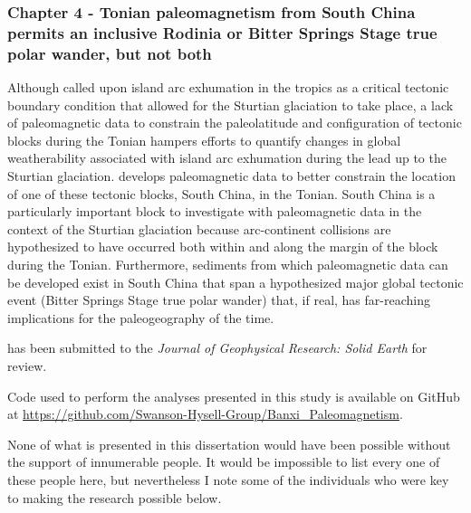 \documentclass{ucbthesis}
\begin{document}
\begin{frontmatter}
\begin{preface}
\subsubsection*{Chapter 4 - Tonian paleomagnetism from South China permits an inclusive Rodinia or Bitter Springs Stage true polar wander, but not both}

\noindent
{}

\bigskip

Although \citet{Park2020a} called upon island arc exhumation in the tropics as a critical tectonic boundary condition that allowed for the Sturtian glaciation to take place, a lack of paleomagnetic data to constrain the paleolatitude and configuration of tectonic blocks during the Tonian hampers efforts to quantify changes in global weatherability associated with island arc exhumation during the lead up to the Sturtian glaciation. \citet{Park2020c} develops paleomagnetic data to better constrain the location of one of these tectonic blocks, South China, in the Tonian. South China is a particularly important block to investigate with paleomagnetic data in the context of the Sturtian glaciation because arc-continent collisions are hypothesized to have occurred both within and along the margin of the block during the Tonian. Furthermore, sediments from which paleomagnetic data can be developed exist in South China that span a hypothesized major global tectonic event (Bitter Springs Stage true polar wander) that, if real, has far-reaching implications for the paleogeography of the time.

\citet{Park2020c} has been submitted to the \textit{Journal of Geophysical Research: Solid Earth} for review.

Code used to perform the analyses presented in this study is available on GitHub at \url{https://github.com/Swanson-Hysell-Group/Banxi_Paleomagnetism}.

\end{preface}


\begin{acknowledgements}

None of what is presented in this dissertation would have been possible without the support of innumerable people. It would be impossible to list every one of these people here, but nevertheless I note some of the individuals who were key to making the research possible below.


\end{acknowledgements}
\end{frontmatter}
\end{document}
